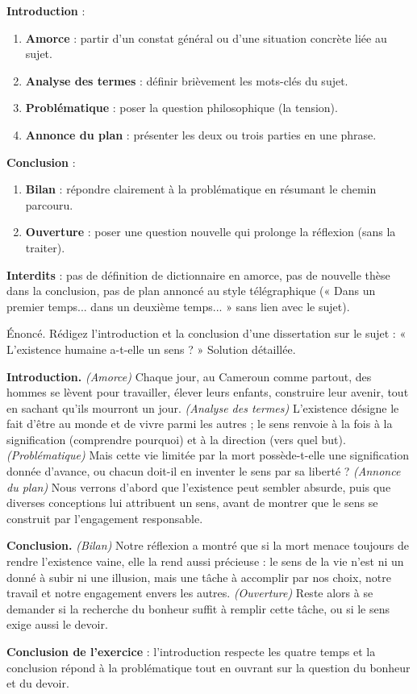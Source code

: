 \documentclass[11pt]{article}
\begin{document}
\begin{methode}
\textbf{Introduction} :
\begin{enumerate}
\item \textbf{Amorce} : partir d'un constat général ou d'une situation concrète liée au sujet.
\item \textbf{Analyse des termes} : définir brièvement les mots-clés du sujet.
\item \textbf{Problématique} : poser la question philosophique (la tension).
\item \textbf{Annonce du plan} : présenter les deux ou trois parties en une phrase.
\end{enumerate}
\textbf{Conclusion} :
\begin{enumerate}
\item \textbf{Bilan} : répondre clairement à la problématique en résumant le chemin parcouru.
\item \textbf{Ouverture} : poser une question nouvelle qui prolonge la réflexion (sans la traiter).
\end{enumerate}
\textbf{Interdits} : pas de définition de dictionnaire en amorce, pas de nouvelle thèse dans la conclusion, pas de plan annoncé au style télégraphique (« Dans un premier temps... dans un deuxième temps... » sans lien avec le sujet).
\end{methode}

\begin{exoresolu}
Énoncé. Rédigez l'introduction et la conclusion d'une dissertation sur le sujet : « L'existence humaine a-t-elle un sens ? »
\tcblower
Solution détaillée.

\textbf{Introduction.} \emph{(Amorce)} Chaque jour, au Cameroun comme partout, des hommes se lèvent pour travailler, élever leurs enfants, construire leur avenir, tout en sachant qu'ils mourront un jour. \emph{(Analyse des termes)} L'existence désigne le fait d'être au monde et de vivre parmi les autres ; le sens renvoie à la fois à la signification (comprendre pourquoi) et à la direction (vers quel but). \emph{(Problématique)} Mais cette vie limitée par la mort possède-t-elle une signification donnée d'avance, ou chacun doit-il en inventer le sens par sa liberté ? \emph{(Annonce du plan)} Nous verrons d'abord que l'existence peut sembler absurde, puis que diverses conceptions lui attribuent un sens, avant de montrer que le sens se construit par l'engagement responsable.

\textbf{Conclusion.} \emph{(Bilan)} Notre réflexion a montré que si la mort menace toujours de rendre l'existence vaine, elle la rend aussi précieuse : le sens de la vie n'est ni un donné à subir ni une illusion, mais une tâche à accomplir par nos choix, notre travail et notre engagement envers les autres. \emph{(Ouverture)} Reste alors à se demander si la recherche du bonheur suffit à remplir cette tâche, ou si le sens exige aussi le devoir.

\textbf{Conclusion de l'exercice} : l'introduction respecte les quatre temps et la conclusion répond à la problématique tout en ouvrant sur la question du bonheur et du devoir.
\end{exoresolu}
\end{document}
